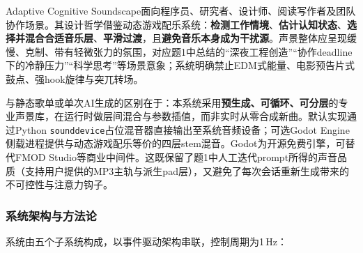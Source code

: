 \documentclass[12pt, fontset=windows]{ctexart}
\begin{document}
Adaptive Cognitive Soundscape面向程序员、研究者、设计师、阅读写作者及团队协作场景。其设计哲学借鉴动态游戏配乐系统：\textbf{检测工作情境}、\textbf{估计认知状态}、\textbf{选择并混合合适音乐层}、\textbf{平滑过渡}，且\textbf{避免音乐本身成为干扰源}。声景整体应呈现缓慢、克制、带有轻微张力的氛围，对应题1中总结的“深夜工程创造”“协作deadline下的冷静压力”“科学思考”等场景意象；系统明确禁止EDM式能量、电影预告片式鼓点、强hook旋律与突兀转场。

与静态歌单或单次AI生成的区别在于：本系统采用\textbf{预生成、可循环、可分层}的专业声景库，在运行时做层间混合与参数插值，而非实时从零合成新曲。默认实现通过Python \texttt{sounddevice}占位混音器直接输出至系统音频设备；可选Godot Engine侧载进程提供与动态游戏配乐等价的四层stem混音。Godot为开源免费引擎，可替代FMOD Studio等商业中间件。这既保留了题1中人工迭代prompt所得的声音品质（支持用户提供的MP3主轨与派生pad层），又避免了每次会话重新生成带来的不可控性与注意力钩子。

\subsubsection{系统架构与方法论}

系统由五个子系统构成，以事件驱动架构串联，控制周期为1\,Hz：
\end{document}
